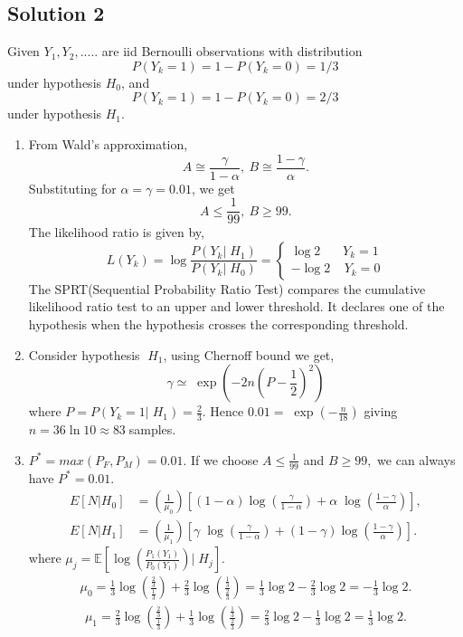 \documentclass[a4paper,english,12pt]{article}
\begin{document}
\hypertarget{solution2}{\subsection*{Solution 2}}
Given $Y_1,Y_2,.....$ are iid Bernoulli observations with distribution
\begin{equation*}
P(Y_k=1)=1-P(Y_k=0)=1/3
\end{equation*}
under hypothesis $H_0$, and 
\begin{equation*}
P(Y_k=1)=1-P(Y_k=0)=2/3
\end{equation*}
under hypothesis $H_1$.
\begin{enumerate}[label=(\alph*).]
\item From Wald's approximation,
\begin{equation*}
A \cong\frac{\gamma}{1-\alpha},~B\cong\frac{1-\gamma}{\alpha}.
\end{equation*}
Substituting for $\alpha=\gamma=0.01$, we get
\begin{equation*}
A\leq\frac{1}{99},~B\geq99.
\end{equation*}
The likelihood ratio is given by,
\begin{equation*}
L(Y_k)= \log\frac{P(Y_k|\;H_1)}{P(Y_k|\;H_0)} =
\begin{cases}
\log2~~~~~~~~Y_k=1 \\
-\log2~~~~~Y_k=0
\end{cases}
\end{equation*}
The SPRT(Sequential Probability Ratio Test) compares the cumulative likelihood ratio test to an upper and lower threshold. It declares one of the hypothesis when the hypothesis crosses the corresponding threshold.
\item Consider hypothesis $\;H_1$, using Chernoff bound we get,
\begin{equation*}
\gamma \simeq\;\exp(-2n(P-\frac{1}{2})^{2})
\end{equation*}
where $P=P(Y_k=1|\;H_1)=\frac{2}{3}$. Hence $0.01 = \;\exp(-\frac{n}{18})$ giving $n = 36 \ln 10\approx 83 \;$samples.
\item $P^{*}=max(P_{F},P_{M})=0.01$. If we choose $A\leq\frac{1}{99}$ and $B\geq99,$ we can always have $P^{*}=0.01$.
\begin{align*}
E[N| H_0]&= (\frac{1}{\mu_0})[(1-\alpha)\log(\frac{\gamma}{1-\alpha})+\alpha\;\log(\frac{1-\gamma}{\alpha})],\\
E[N| H_1]&= (\frac{1}{\mu_1})[\gamma\;\log(\frac{\gamma}{1-\alpha})+(1-\gamma)\log(\frac{1-\gamma}{\alpha})].
\end{align*}
where $\mu_{j}=\mathbb{E}\left[\log\left(\frac{P_{1}(Y_{1})}{P_{0}(Y_{1})}\right)|\;H_{j}\right]$.
\begin{align*}
\mu_{0}=\frac{1}{3}\log\left(\frac{\frac{2}{3}}{\frac{1}{3}}\right) +\frac{2}{3}\log\left(\frac{\frac{1}{3}}{\frac{2}{3}}\right)=\frac{1}{3}\log2 - \frac{2}{3} \log2=- \frac{1}{3} \log2.
\end{align*}
\begin{align*}
\mu_{1}=\frac{2}{3}\log\left(\frac{\frac{2}{3}}{\frac{1}{3}}\right) +\frac{1}{3}\log\left(\frac{\frac{1}{3}}{\frac{2}{3}}\right)=\frac{2}{3}\log2 - \frac{1}{3} \log2=\frac{1}{3} \log2.
\end{align*}
\end{enumerate}
\end{document}
